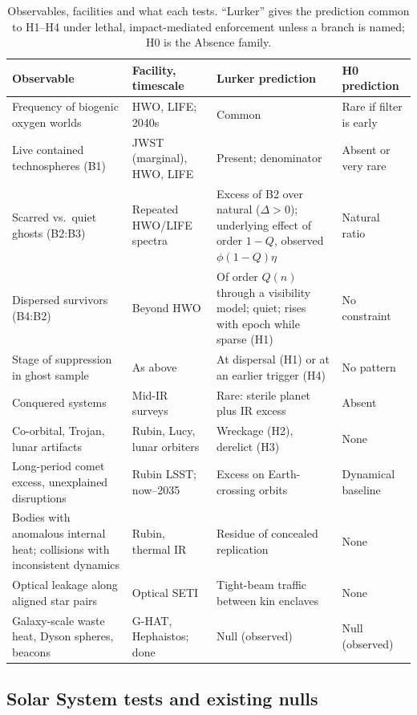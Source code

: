 \documentclass[preprint,12pt]{elsarticle}
\theoremstyle{definition}
\begin{document}
\begin{table}[!htbp]
\centering
\caption{Observables, facilities and what each tests. ``Lurker'' gives the prediction common to H1--H4 under lethal, impact-mediated enforcement unless a branch is named; H0 is the Absence family.}
\label{tab:observables}
\footnotesize
\begin{tabularx}{\textwidth}{@{}>{\raggedright\arraybackslash}X>{\raggedright\arraybackslash}p{2.6cm}>{\raggedright\arraybackslash}X>{\raggedright\arraybackslash}p{2.4cm}@{}}
\toprule
Observable & Facility, timescale & Lurker prediction & H0 prediction \\
\midrule
Frequency of biogenic oxygen worlds & HWO, LIFE; 2040s & Common & Rare if filter is early \\
Live contained technospheres (B1) & JWST (marginal), HWO, LIFE & Present; denominator & Absent or very rare \\
Scarred vs.\ quiet ghosts (B2:B3) & Repeated HWO/LIFE spectra & Excess of B2 over natural ($\Delta > 0$); underlying effect of order $1-Q$, observed $\phi(1-Q)\eta$ & Natural ratio \\
Dispersed survivors (B4:B2) & Beyond HWO & Of order $Q(n)$ through a visibility model; quiet; rises with epoch while sparse (H1) & No constraint \\
Stage of suppression in ghost sample & As above & At dispersal (H1) or at an earlier trigger (H4) & No pattern \\
Conquered systems & Mid-IR surveys & Rare: sterile planet plus IR excess & Absent \\
Co-orbital, Trojan, lunar artifacts & Rubin, Lucy, lunar orbiters & Wreckage (H2), derelict (H3) & None \\
Long-period comet excess, unexplained disruptions & Rubin LSST; now--2035 & Excess on Earth-crossing orbits & Dynamical baseline \\
Bodies with anomalous internal heat; collisions with inconsistent dynamics & Rubin, thermal IR & Residue of concealed replication & None \\
Optical leakage along aligned star pairs & Optical SETI & Tight-beam traffic between kin enclaves & None \\
Galaxy-scale waste heat, Dyson spheres, beacons & G-HAT, Hephaistos; done & Null (observed) & Null (observed) \\
\bottomrule
\end{tabularx}
\end{table}

\subsection{Solar System tests and existing nulls}
\label{sec:nulls}
\end{document}
